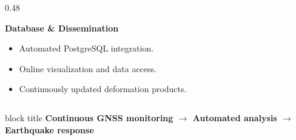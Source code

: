 \begin{frame}
\begin{columns}[T,onlytextwidth]
\begin{column}{0.48\textwidth}
\vspace{0.3cm}

\begin{block}{\textbf{Database \& Dissemination}}
\begin{itemize}
    \setlength{\itemsep}{5pt}
    \item Automated PostgreSQL integration.
    \item Online visualization and data access.
    \item Continuously updated deformation products.
\end{itemize}
\end{block}

\end{column}
\end{columns}

\vfill

\begin{center}
\begin{beamercolorbox}[wd=\textwidth,sep=7pt,center,
    rounded=true]{block title}
\textbf{Continuous GNSS monitoring $\rightarrow$
Automated analysis $\rightarrow$
Earthquake response}
\end{beamercolorbox}
\end{center}

\end{frame}
\note{}



